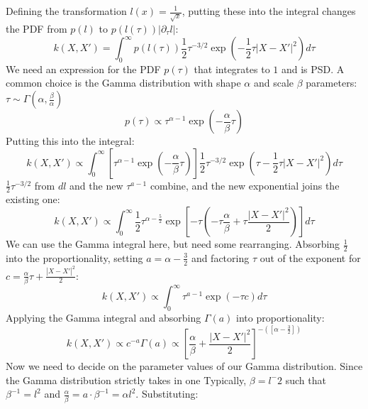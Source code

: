 Defining the transformation $l(x) = \frac{1}{\sqrt{x}}$, putting these into the integral changes the PDF from $p(l)$ to $p(l(\tau)) | \partial_{\tau}l |$:
\begin{equation*}
    k(X,X') = \int_{0}^{\infty} p(l(\tau)) \frac{1}{2} \tau^{-3/2} \exp \left( -\frac{1}{2} \tau |X - X'|^2 \right) d\tau
\end{equation*}
We need an expression for the PDF $p(\tau)$ that integrates to $1$ and is PSD. A common choice is the Gamma distribution with shape $\alpha$ and scale $\beta$ parameters: $\tau \sim \Gamma(\alpha, \frac{\beta}{\alpha})$ 
\begin{equation*}
    p(\tau) \propto \tau ^{\alpha - 1} \exp \left( - \frac{\alpha}{\beta} \tau \right)
\end{equation*}
Putting this into the integral:
\begin{equation*}
    k(X,X') \propto \int_{0}^{\infty}  \left[ \tau^{\alpha - 1} \exp \left(-\frac{\alpha}{\beta} \tau \right) \right] \frac{1}{2}\tau^{-3/2} \exp \left( \tau - \frac{1}{2} \tau |X - X'|^2 \right) d\tau
\end{equation*}
$\frac{1}{2}\tau^{-3/2}$ from $dl$ and the new $\tau^{a-1}$ combine, and the new exponential joins the existing one:
\begin{equation*}
    k(X,X') \propto \int_{0}^{\infty} \frac{1}{2} \tau^{\alpha - \frac{5}{2}} \exp \left[ -\tau \left( -\tau\frac{\alpha}{\beta} + \tau \frac{|X - X'|^2}{2} \right) \right] d\tau
\end{equation*}
We can use the Gamma integral here, but need some rearranging. Absorbing $\frac{1}{2}$ into the proportionality, setting $a = \alpha - \frac{3}{2}$ and factoring $\tau$ out of the exponent for $c = \frac{\alpha}{\beta}\tau + \frac{|X - X'|^2}{2}$:
\begin{equation*}
    k(X,X') \propto \int_{0}^{\infty} \tau^{a - 1} \exp ( -\tau c ) d\tau
\end{equation*}
Applying the Gamma integral and absorbing $\Gamma(a)$ into proportionality:
\begin{equation*}
    k(X,X') \propto c^{-a} \Gamma(a) \propto \left[ \frac{\alpha}{\beta} + \frac{|X - X'|^2}{2} \right]^{-\left( \left[ \alpha - \frac{3}{2} \right] \right)} 
\end{equation*}
Now we need to decide on the parameter values of our Gamma distribution. Since the Gamma distribution strictly takes in one Typically, $\beta = l^-2$ such that $\beta^{-1} = l^2$ and $\frac{\alpha}{\beta} = a \cdot \beta^{-1} = \alpha l^2$. Substituting:
